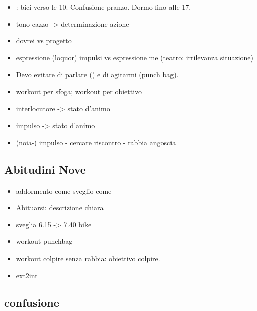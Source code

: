\begin{itemize}
\item {}: bici verso le 10. Confusione pranzo. Dormo fino alle 17.

\item tono cazzo -> determinazione azione

\item dovrei vs progetto

\item espressione (loquor) impulsi vs espressione me (teatro: irrilevanza situazione)


\item Devo evitare di parlare () e di agitarmi (punch bag).

\item workout per sfoga; workout per obiettivo

\item interlocutore -> stato d'animo

\item impulso -> stato d'animo

\item (noia-) impulso - cercare riscontro - rabbia angoscia

\end{itemize}

\subsection{Abitudini Nove}

\begin{itemize}

\item addormento come-sveglio come

\item Abituarsi: descrizione chiara

\item sveglia 6.15 -> 7.40 bike

\item workout punchbag

\item workout colpire senza rabbia: obiettivo colpire.

\item ext2int

\end{itemize}

\subsection{confusione}

